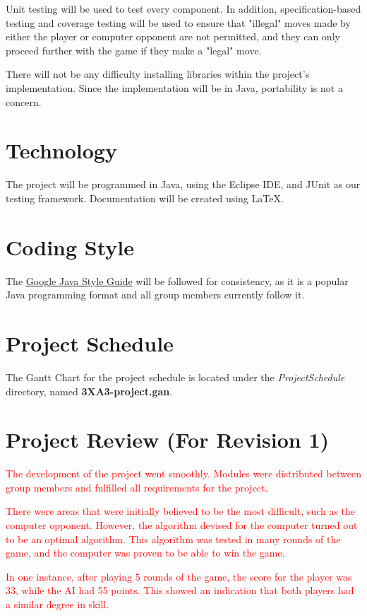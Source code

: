 \documentclass[12pt]{article}
\begin{document}
Unit testing will be used to test every component. In addition, specification-based testing and coverage testing will be used to ensure that "illegal" moves made by either the player or computer opponent are not permitted, and they can only proceed further with the game if they make a "legal" move.

There will not be any difficulty installing libraries within the project's implementation. Since the implementation will be in Java, portability is not a concern.

\section{Technology}
The project will be programmed in Java, using the Eclipse IDE, and JUnit as our testing framework. Documentation will be created using LaTeX.

\section{Coding Style}
The \href{https://google.github.io/styleguide/javaguide.html}{Google Java Style Guide} will be followed for consistency, as it is a popular Java programming format and all group members currently follow it.

\section{Project Schedule}
The Gantt Chart for the project schedule is located under the \textit{ProjectSchedule} directory, named \textbf{3XA3-project.gan}.

\section{Project Review (For Revision 1)}

\textcolor{red}{The development of the project went smoothly. Modules were distributed between group members and fulfilled all requirements for the project.} 

\textcolor{red}{There were areas that were initially believed to be the most difficult, such as the computer opponent. However, the algorithm devised for the computer turned out to be an optimal algorithm. This algorithm was tested in many rounds of the game, and the computer was proven to be able to win the game.}

\textcolor{red}{In one instance, after playing 5 rounds of the game, the score for the player was 33, while the AI had 55 points. This showed an indication that both players had a similar degree in skill.}
\end{document}
